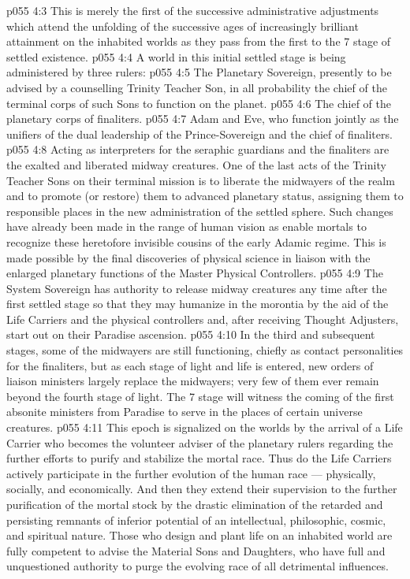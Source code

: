 \vs p055 4:3 This is merely the first of the successive administrative adjustments which attend the unfolding of the successive ages of increasingly brilliant attainment on the inhabited worlds as they pass from the first to the 7 stage of settled existence.
\vs p055 4:4 \bibnobreakspace {} A world in this initial settled stage is being administered by three rulers:
\vs p055 4:5 \bibnobreakspace The Planetary Sovereign, presently to be advised by a counselling Trinity Teacher Son, in all probability the chief of the terminal corps of such Sons to function on the planet.
\vs p055 4:6 \bibnobreakspace The chief of the planetary corps of finaliters.
\vs p055 4:7 \bibnobreakspace Adam and Eve, who function jointly as the unifiers of the dual leadership of the Prince\hyp{}Sovereign and the chief of finaliters.
\vs p055 4:8 \pc Acting as interpreters for the seraphic guardians and the finaliters are the exalted and liberated midway creatures. One of the last acts of the Trinity Teacher Sons on their terminal mission is to liberate the midwayers of the realm and to promote (or restore) them to advanced planetary status, assigning them to responsible places in the new administration of the settled sphere. Such changes have already been made in the range of human vision as enable mortals to recognize these heretofore invisible cousins of the early Adamic regime. This is made possible by the final discoveries of physical science in liaison with the enlarged planetary functions of the Master Physical Controllers.
\vs p055 4:9 The System Sovereign has authority to release midway creatures any time after the first settled stage so that they may humanize in the morontia by the aid of the Life Carriers and the physical controllers and, after receiving Thought Adjusters, start out on their Paradise ascension.
\vs p055 4:10 In the third and subsequent stages, some of the midwayers are still functioning, chiefly as contact personalities for the finaliters, but as each stage of light and life is entered, new orders of liaison ministers largely replace the midwayers; very few of them ever remain beyond the fourth stage of light. The 7 stage will witness the coming of the first absonite ministers from Paradise to serve in the places of certain universe creatures.
\vs p055 4:11 \bibnobreakspace {} This epoch is signalized on the worlds by the arrival of a Life Carrier who becomes the volunteer adviser of the planetary rulers regarding the further efforts to purify and stabilize the mortal race. Thus do the Life Carriers actively participate in the further evolution of the human race --- physically, socially, and economically. And then they extend their supervision to the further purification of the mortal stock by the drastic elimination of the retarded and persisting remnants of inferior potential of an intellectual, philosophic, cosmic, and spiritual nature. Those who design and plant life on an inhabited world are fully competent to advise the Material Sons and Daughters, who have full and unquestioned authority to purge the evolving race of all detrimental influences.
